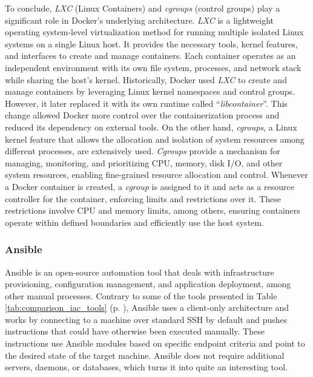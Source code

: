 To conclude, \textit{LXC} (Linux Containers) and \textit{cgroups} (control groups) play a significant role in Docker's underlying architecture. \textit{LXC} is a lightweight operating system-level virtualization method for running multiple isolated Linux systems on a single Linux host. It provides the necessary tools, kernel features, and interfaces to create and manage containers. Each container operates as an independent environment with its own file system, processes, and network stack while sharing the host's kernel. Historically, Docker used \textit{LXC} to create and manage containers by leveraging Linux kernel namespaces and control groups. However, it later replaced it with its own runtime called ``\textit{libcontainer}''. This change allowed Docker more control over the containerization process and reduced its dependency on external tools.
On the other hand, \textit{cgroups}, a Linux kernel feature that allows the allocation and isolation of system resources among different processes, are extensively used. \textit{Cgroups} provide a mechanism for managing, monitoring, and prioritizing CPU, memory, disk I/O, and other system resources, enabling fine-grained resource allocation and control. Whenever a Docker container is created, a \textit{cgroup} is assigned to it and acts as a resource controller for the container, enforcing limits and restrictions over it. These restrictions involve CPU and memory limits, among others, ensuring containers operate within defined boundaries and efficiently use the host system.

\subsubsection{Ansible} \label{sec:selected_tools_ansible}

Ansible is an open-source automation tool that deals with infrastructure provisioning, configuration management, and application deployment, among other manual processes. Contrary to some of the tools presented in Table \ref{tab:comparison_iac_tools} (p. \pageref{tab:comparison_iac_tools}), Ansible uses a client-only architecture and works by connecting to a machine over standard SSH by default and pushes instructions that could have otherwise been executed manually. These instructions use Ansible modules based on specific endpoint criteria and point to the desired state of the target machine. Ansible does not require additional servers, daemons, or databases, which turns it into quite an interesting tool.

